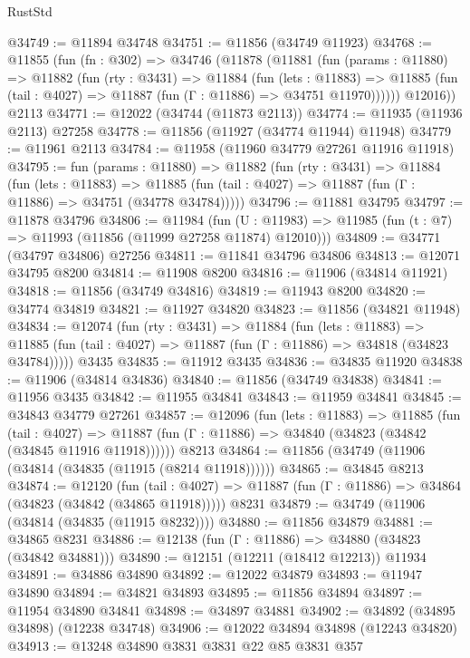 \begin{lexlean}{RustStd}
\begin{coremodule}
@34749 := @11894 @34748
@34751 := @11856 (@34749 @11923)
@34768 := @11855
    (fun (fn : @302) =>
    @34746
      (@11878
        (@11881
          (fun (params : @11880) =>
          @11882
            (fun (rty : @3431) =>
            @11884
              (fun (lets : @11883) =>
              @11885 (fun (tail : @4027) => @11887 (fun (Γ : @11886) => @34751 @11970))))))
        @12016))
    @2113
@34771 := @12022 (@34744 (@11873 @2113))
@34774 := @11935 (@11936 @2113) @27258
@34778 := @11856 (@11927 (@34774 @11944) @11948)
@34779 := @11961 @2113
@34784 := @11958 (@11960 @34779 @27261 @11916 @11918)
@34795 := fun (params : @11880) =>
  @11882
    (fun (rty : @3431) =>
    @11884
      (fun (lets : @11883) =>
      @11885 (fun (tail : @4027) => @11887 (fun (Γ : @11886) => @34751 (@34778 @34784)))))
@34796 := @11881 @34795
@34797 := @11878 @34796
@34806 := @11984
    (fun (U : @11983) => @11985 (fun (t : @7) => @11993 (@11856 (@11999 @27258 @11874) @12010)))
@34809 := @34771 (@34797 @34806) @27256
@34811 := @11841 @34796 @34806
@34813 := @12071 @34795 @8200
@34814 := @11908 @8200
@34816 := @11906 (@34814 @11921)
@34818 := @11856 (@34749 @34816)
@34819 := @11943 @8200
@34820 := @34774 @34819
@34821 := @11927 @34820
@34823 := @11856 (@34821 @11948)
@34834 := @12074
    (fun (rty : @3431) =>
    @11884
      (fun (lets : @11883) =>
      @11885 (fun (tail : @4027) => @11887 (fun (Γ : @11886) => @34818 (@34823 @34784)))))
    @3435
@34835 := @11912 @3435
@34836 := @34835 @11920
@34838 := @11906 (@34814 @34836)
@34840 := @11856 (@34749 @34838)
@34841 := @11956 @3435
@34842 := @11955 @34841
@34843 := @11959 @34841
@34845 := @34843 @34779 @27261
@34857 := @12096
    (fun (lets : @11883) =>
    @11885
      (fun (tail : @4027) =>
      @11887 (fun (Γ : @11886) => @34840 (@34823 (@34842 (@34845 @11916 @11918))))))
    @8213
@34864 := @11856 (@34749 (@11906 (@34814 (@34835 (@11915 (@8214 @11918))))))
@34865 := @34845 @8213
@34874 := @12120
    (fun (tail : @4027) => @11887 (fun (Γ : @11886) => @34864 (@34823 (@34842 (@34865 @11918)))))
    @8231
@34879 := @34749 (@11906 (@34814 (@34835 (@11915 @8232))))
@34880 := @11856 @34879
@34881 := @34865 @8231
@34886 := @12138 (fun (Γ : @11886) => @34880 (@34823 (@34842 @34881)))
@34890 := @12151 (@12211 (@18412 @12213)) @11934
@34891 := @34886 @34890
@34892 := @12022 @34879
@34893 := @11947 @34890
@34894 := @34821 @34893
@34895 := @11856 @34894
@34897 := @11954 @34890 @34841
@34898 := @34897 @34881
@34902 := @34892 (@34895 @34898) (@12238 @34748)
@34906 := @12022 @34894 @34898 (@12243 @34820)
@34913 := @13248 @34890 @3831 @3831 @22 @85 @3831 @357

\end{coremodule}
\end{lexlean}
